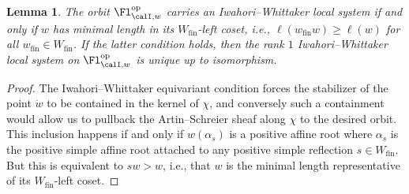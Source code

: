 \documentclass[10pt, reqno]{amsart}
\theoremstyle{plain}
\newtheorem{lemma}[theorem]{Lemma}
\theoremstyle{definition}
\numberwithin{equation}{section}
\begin{document}
\begin{lemma}
	\label{sec:iwah-whitt-aver-support-of-iwahori-whittaker-sheaves}
	The orbit $\Fl^{\mathrm{op}}_{\calI,w} $ carries an Iwahori--Whittaker local system if and only if $w$ has minimal length in its $W_{\mathrm{fin}}$-left coset, i.e., $\ell(w_{\mathrm{fin}}w)\geq \ell(w)$ for all $w_{\mathrm{fin}}\in W_{\mathrm{fin}}$. If the latter condition holds, then the rank $1$ Iwahori--Whittaker local system on $\Fl^{\mathrm{op}}_{\calI,w} $ is unique up to isomorphism.
\end{lemma}

\begin{proof}
	The Iwahori--Whittaker equivariant condition forces the stabilizer of the point $\dot{w}$ to be contained in the kernel of $\chi$, and conversely such a containment would allow us to pullback the Artin--Schreier sheaf along $\chi$ to the desired orbit. This inclusion happens if and only if $w(\alpha_s)$ is a positive affine root where $\alpha_s$ is the positive simple affine root attached to any positive simple reflection $s \in W_{\mathrm{fin}}$. But this is equivalent to $sw>w$, i.e., that $w$ is the minimal length representative of its $W_{\mathrm{fin}}$-left coset.
\end{proof}
\end{document}
